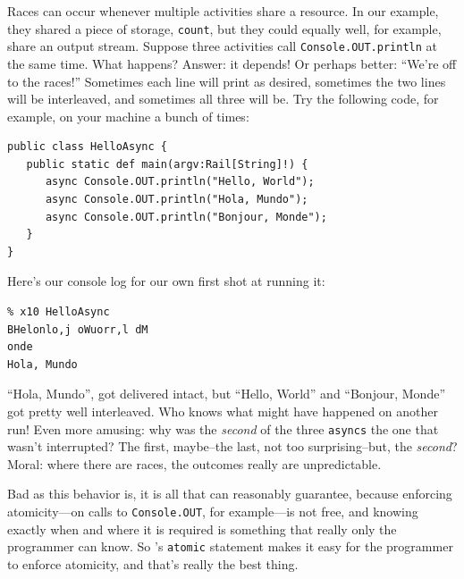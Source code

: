 Races can occur whenever multiple activities share a resource.  In our example,
they shared a piece of storage, {\tt count}, but they could equally well, for
example, share an output stream.  Suppose three activities
call {\tt Console.OUT.println} at the same time.  What happens?  Answer:
it depends! Or perhaps better: ``We're off to the races!''  Sometimes each line
will print as desired, sometimes the two lines will be interleaved, and
sometimes all three will be. Try the following code, for example, on your
machine a bunch of times:
\begin{verbatim}
public class HelloAsync {
   public static def main(argv:Rail[String]!) {
      async Console.OUT.println("Hello, World");
      async Console.OUT.println("Hola, Mundo");
      async Console.OUT.println("Bonjour, Monde");
   }
}
\end{verbatim}
Here's our console log for our own first shot at running it:
\begin{verbatim}
% x10 HelloAsync
BHelonlo,j oWuorr,l dM
onde
Hola, Mundo
\end{verbatim}
``Hola, Mundo'', got delivered intact, but ``Hello, World'' and
``Bonjour, Monde'' got pretty well interleaved.  Who knows what might have
happened on another run!  Even more amusing: why was the {\em second} of the
three {\tt asyncs} the one that wasn't interrupted?  The first, maybe--the last,
not too surprising--but, the {\em second}?  Moral: where there are races, the
outcomes really are unpredictable. 

Bad as this behavior is, it is all that \Xten{} can reasonably
guarantee, because enforcing atomicity---on calls to {\tt Console.OUT},
for example---is not free, and knowing exactly when and where it is required is
something that really only the programmer can  know. So \Xten's {\tt atomic}
statement makes it easy for the programmer to enforce atomicity, and that's
really the best thing.

